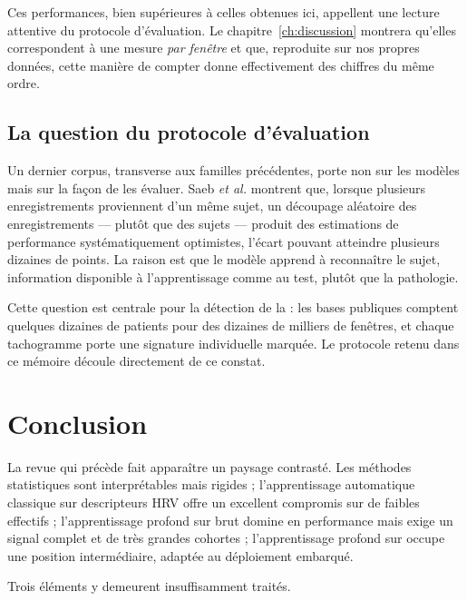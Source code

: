 Ces performances, bien supérieures à celles obtenues ici, appellent une lecture attentive du protocole d'évaluation. Le chapitre~\ref{ch:discussion} montrera qu'elles correspondent à une mesure \emph{par fenêtre} et que, reproduite sur nos propres données, cette manière de compter donne effectivement des chiffres du même ordre.

\subsection{La question du protocole d'évaluation}
\label{sec:soa:protocole}
Un dernier corpus, transverse aux familles précédentes, porte non sur les modèles mais sur la façon de les évaluer. Saeb \textit{et al.} \cite{saeb2017need} montrent que, lorsque plusieurs enregistrements proviennent d'un même sujet, un découpage aléatoire des enregistrements — plutôt que des sujets — produit des estimations de performance systématiquement optimistes, l'écart pouvant atteindre plusieurs dizaines de points. La raison est que le modèle apprend à reconnaître le sujet, information disponible à l'apprentissage comme au test, plutôt que la pathologie.

Cette question est centrale pour la détection de la \FA{} : les bases publiques comptent quelques dizaines de patients pour des dizaines de milliers de fenêtres, et chaque tachogramme porte une signature individuelle marquée. Le protocole retenu dans ce mémoire découle directement de ce constat.

\section{Conclusion}
\label{sec:soa:positionnement}

La revue qui précède fait apparaître un paysage contrasté. Les méthodes statistiques sont interprétables mais rigides ; l'apprentissage automatique classique sur descripteurs HRV offre un excellent compromis sur de faibles effectifs ; l'apprentissage profond sur \ECG{} brut domine en performance mais exige un signal complet et de très grandes cohortes ; l'apprentissage profond sur \RR{} occupe une position intermédiaire, adaptée au déploiement embarqué.

Trois éléments y demeurent insuffisamment traités.

